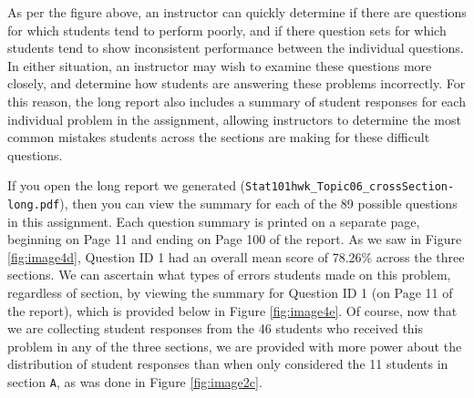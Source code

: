\documentclass[11pt,a4paper,oldfontcommands,openany]{memoir}
\numberwithin{equation}{section} %
\begin{document}
As per the figure above, an instructor can quickly determine if there are questions for which students tend to perform poorly, and if there question sets for which students tend to show inconsistent performance between the individual questions. In either situation, an instructor may wish to examine these questions more closely, and determine how students are answering these problems incorrectly. For this reason, the long report also includes a summary of student responses for each individual problem in the assignment, allowing instructors to determine the most common mistakes students across the sections are making for these difficult questions.

If you open the long report we generated (\texttt{Stat101hwk\_Topic06\_crossSection-long.pdf}), then you can view the summary for each of the 89 possible questions in this assignment. Each question summary is printed on a separate page, beginning on Page 11 and ending on Page 100 of the report. As we saw in Figure \ref{fig:image4d}, Question ID 1 had an overall mean score of 78.26\% across the three sections. We can ascertain what types of errors students made on this problem, regardless of section, by viewing the summary for Question ID 1 (on Page 11 of the report), which is provided below in Figure \ref{fig:image4e}. Of course, now that we are collecting student responses from the 46 students who received this problem in any of the three sections, we are provided with more power about the distribution of student responses than when only considered the 11 students in section \texttt{A}, as was done in Figure \ref{fig:image2c}.

\begin{center}
\captionsetup{width=\textwidth}
\label{fig:image4e}
\end{center}
\end{document}
